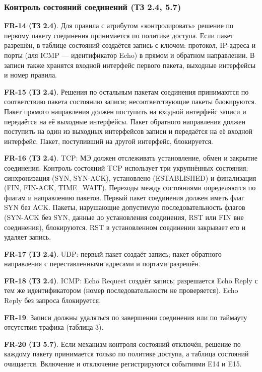 \documentclass[13pt,a4paper,final]{article}
\begin{document}
	\subsubsection{Контроль состояний соединений (ТЗ 2.4, 5.7)}
	
	\textbf{FR-14 (ТЗ 2.4)}. Для правила с атрибутом «контролировать» решение по первому пакету соединения принимается по политике доступа. Если пакет разрешён, в таблице состояний создаётся запись с ключом: протокол, IP-адреса и порты (для ICMP — идентификатор Echo) в прямом и обратном направлении. В записи также хранятся входной интерфейс первого пакета, выходные интерфейсы и номер правила.
	
	\textbf{FR-15 (ТЗ 2.4)}. Решения по остальным пакетам соединения принимаются по соответствию пакета состоянию записи; несоответствующие пакеты блокируются. Пакет прямого направления должен поступить на входной интерфейс записи и передаётся на её выходные интерфейсы. Пакет обратного направления должен поступить на один из выходных интерфейсов записи и передаётся на её входной интерфейс. Пакет, поступивший на другой интерфейс, блокируется.
	
	\textbf{FR-16 (ТЗ 2.4)}. TCP: МЭ должен отслеживать установление, обмен и закрытие соединения. Контроль состояний TCP использует три укрупнённых состояния: синхронизация (SYN, SYN-ACK), установлено (ESTABLISHED) и финализация (FIN, FIN-ACK, TIME\_WAIT). Переходы между состояниями определяются по флагам и направлению пакетов. Первый пакет соединения должен иметь флаг SYN без ACK. Пакеты, нарушающие допустимую последовательность флагов (SYN-ACK без SYN, данные до установления соединения, RST или FIN вне соединения), блокируются. RST в установленном соединении закрывает его и удаляет запись.
	
	\textbf{FR-17 (ТЗ 2.4)}. UDP: первый пакет создаёт запись; пакет обратного направления с переставленными адресами и портами разрешён.
	
	\textbf{FR-18 (ТЗ 2.4)}. ICMP: Echo Request создаёт запись; разрешается Echo Reply с тем же идентификатором (номер последовательности не проверяется). Echo Reply без запроса блокируется.
	
	\textbf{FR-19}. Записи должны удаляться по завершении соединения или по таймауту отсутствия трафика (таблица 3).
	
	\textbf{FR-20 (ТЗ 5.7)}. Если механизм контроля состояний отключён, решение по каждому пакету принимается только по политике доступа, а таблица состояний очищается. Включение и отключение регистрируются событиями E14 и E15.
	
\end{document}
